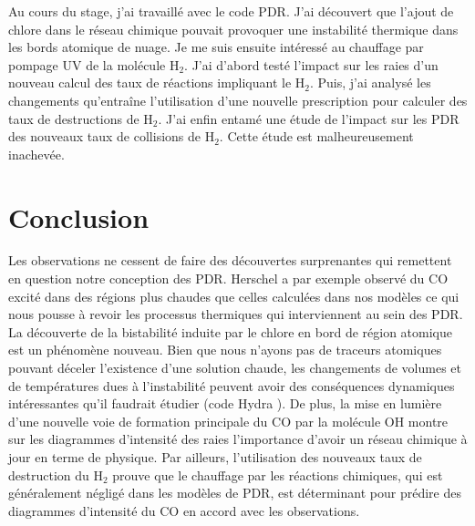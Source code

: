\documentclass[11pt,a4paper,twoside,openright]{article}
\begin{document}
\begin{spacing}{0.98}
Au cours du stage, j'ai travaillé avec le code PDR. J'ai découvert que l'ajout de chlore dans le réseau chimique pouvait provoquer une instabilité thermique dans les bords atomique de nuage. Je me suis ensuite intéressé au chauffage par pompage UV de la molécule $\mathrm{H}_2$. J'ai d'abord testé l'impact sur les raies d'un nouveau calcul des taux de réactions impliquant le $\mathrm{H}_2$. Puis, j'ai analysé les changements qu'entraîne l'utilisation d'une nouvelle prescription pour calculer des taux de destructions de $\mathrm{H}_2$. J'ai enfin entamé une étude de l'impact sur les PDR des nouveaux taux de collisions de $\mathrm{H}_2$. Cette étude est malheureusement inachevée.






\setcounter{secnumdepth}{4}
\clearpage

\clearpage


\setcounter{secnumdepth}{-1}
\clearpage
\part{Conclusion}

Les observations ne cessent de faire des découvertes surprenantes qui remettent en question notre conception des PDR. Herschel a par exemple observé du $\mathrm{CO}$ excité dans des régions plus chaudes que celles calculées dans nos modèles ce qui nous pousse à revoir les processus thermiques qui interviennent au sein des PDR. La découverte de la bistabilité induite par le chlore en bord de région atomique est un phénomène nouveau. Bien que nous n'ayons pas de traceurs atomiques pouvant déceler l'existence d'une solution chaude, les changements de volumes et de températures dues à l'instabilité peuvent avoir des conséquences dynamiques intéressantes qu'il faudrait étudier (code Hydra \cite{Bron2018}). De plus, la mise en lumière d'une nouvelle voie de formation principale du $\mathrm{CO}$ par la molécule $\mathrm{OH}$ montre sur les diagrammes d'intensité des raies l'importance d'avoir un réseau chimique à jour en terme de physique. Par ailleurs, l'utilisation des nouveaux taux de destruction du $\mathrm{H}_2$ prouve que le chauffage par les réactions chimiques, qui est généralement négligé dans les modèles de PDR, est déterminant pour prédire des diagrammes d'intensité du $\mathrm{CO}$ en accord avec les observations. \newline 


\end{spacing}
\end{document}
